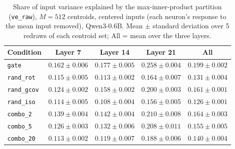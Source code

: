 \begin{table}[t]
\centering
\begin{tabular}{lcccc}
\toprule
Condition & Layer 7 & Layer 14 & Layer 21 & All \\
\midrule
\texttt{gate} & $0.162 \pm 0.006$ & $0.177 \pm 0.005$ & $0.258 \pm 0.004$ & $0.199 \pm 0.002$ \\
\addlinespace
\texttt{rand\_rot} & $0.115 \pm 0.005$ & $0.113 \pm 0.002$ & $0.164 \pm 0.007$ & $0.131 \pm 0.004$ \\
\texttt{rand\_gcov} & $0.124 \pm 0.002$ & $0.158 \pm 0.002$ & $0.200 \pm 0.003$ & $0.161 \pm 0.001$ \\
\texttt{rand\_iso} & $0.114 \pm 0.005$ & $0.108 \pm 0.004$ & $0.156 \pm 0.005$ & $0.126 \pm 0.001$ \\
\addlinespace
\texttt{combo\_2} & $0.139 \pm 0.004$ & $0.142 \pm 0.004$ & $0.210 \pm 0.008$ & $0.164 \pm 0.003$ \\
\texttt{combo\_5} & $0.126 \pm 0.003$ & $0.132 \pm 0.006$ & $0.208 \pm 0.011$ & $0.155 \pm 0.005$ \\
\texttt{combo\_20} & $0.113 \pm 0.002$ & $0.119 \pm 0.007$ & $0.188 \pm 0.006$ & $0.140 \pm 0.004$ \\
\bottomrule
\end{tabular}
\caption{Share of input variance explained by the max-inner-product partition (\texttt{ve\_raw}), $M = 512$ centroids, centered inputs (each neuron's response to the mean input removed), Qwen3-0.6B. Mean $\pm$ standard deviation over 5 redraws of each centroid set; All = mean over the three layers.}
\label{tab:ve-raw-ip-centered-M512}
\end{table}

